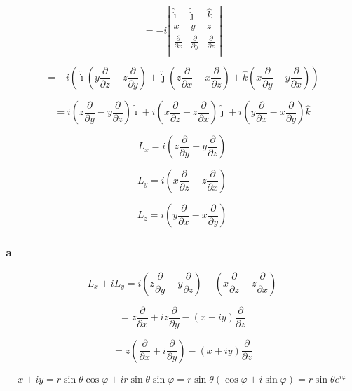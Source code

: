 \documentclass[12pt]{article}
\begin{document}
\[
    = -i \left\lvert \begin{array}{ccc}
        \hat{\dot{\imath}}          & \hat{\dot{\jmath}}          & \hat{k}                     \\
        x                           & y                           & z                           \\
        \frac{\partial}{\partial x} & \frac{\partial}{\partial y} & \frac{\partial}{\partial z} \\
    \end{array} \right\rvert
\]

\[
    =
    -i
    \left(
    \hat{\dot{\imath}} \left(y \frac{\partial}{\partial z} - z \frac{\partial}{\partial y}\right)
    + \hat{\dot{\jmath}} \left(z \frac{\partial}{\partial x} - x \frac{\partial}{\partial z}\right)
    + \hat{k} \left(x \frac{\partial}{\partial y} - y \frac{\partial}{\partial x}\right)
    \right)
\]

\[
    = i \left(z \frac{\partial}{\partial y} - y \frac{\partial}{\partial z}\right) \hat{\dot{\imath}}
    + i \left(x \frac{\partial}{\partial z} - z \frac{\partial}{\partial x}\right) \hat{\dot{\jmath}}
    + i \left(y \frac{\partial}{\partial x} - x \frac{\partial}{\partial y}\right) \hat{k}
\]

\[
    L_x = i \left(z \frac{\partial}{\partial y} - y \frac{\partial}{\partial z}\right)
\]

\[
    L_y = i \left(x \frac{\partial}{\partial z} - z \frac{\partial}{\partial x}\right)
\]

\[
    L_z = i \left(y \frac{\partial}{\partial x} - x \frac{\partial}{\partial y}\right)
\]

\subsubsection{a}

\[
    L_x + i L_y = i \left(z \frac{\partial}{\partial y} - y \frac{\partial}{\partial z}\right)
    - \left(x \frac{\partial}{\partial z} - z \frac{\partial}{\partial x}\right)
\]

\[
    = z \frac{\partial}{\partial x} + i z \frac{\partial}{\partial y} - \left(x + i y\right)
    \frac{\partial}{\partial z}
\]

\[
    = z \left(\frac{\partial}{\partial x} + i \frac{\partial}{\partial y}\right)  - \left(x + i y\right)
    \frac{\partial}{\partial z}
\]

\[
    x + i y = r \sin{\theta} \cos{\varphi} + i r \sin{\theta} \sin{\varphi} = r \sin{\theta}
    \left(\cos{\varphi} + i \sin{\varphi}\right) = r \sin{\theta} e^{i \varphi}
\]
\end{document}
